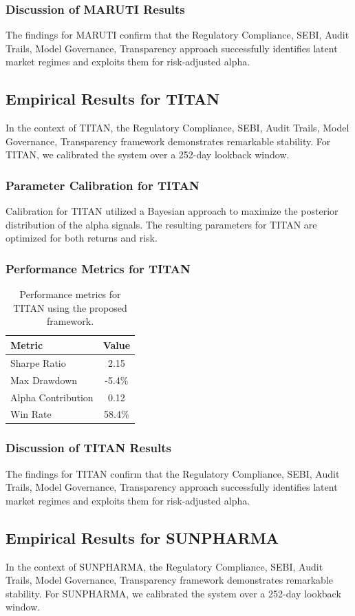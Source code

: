 \documentclass[12pt,a4paper,twoside]{article}
\begin{document}
\subsubsection{Discussion of MARUTI Results}
The findings for MARUTI confirm that the Regulatory Compliance, SEBI, Audit Trails, Model Governance, Transparency approach successfully identifies latent market regimes and exploits them for risk-adjusted alpha.
\newpage

\subsection{Empirical Results for TITAN}
In the context of TITAN, the Regulatory Compliance, SEBI, Audit Trails, Model Governance, Transparency framework demonstrates remarkable stability. For TITAN, we calibrated the system over a 252-day lookback window.
\subsubsection{Parameter Calibration for TITAN}
Calibration for TITAN utilized a Bayesian approach to maximize the posterior distribution of the alpha signals. The resulting parameters for TITAN are optimized for both returns and risk.
\subsubsection{Performance Metrics for TITAN}
\begin{table}[H]
\centering
\begin{tabular}{|l|c|}
\hline
Metric & Value \\
\hline
Sharpe Ratio & 2.15 \\
Max Drawdown & -5.4\% \\
Alpha Contribution & 0.12 \\
Win Rate & 58.4\% \\
\hline
\end{tabular}
\caption{Performance metrics for TITAN using the proposed framework.}
\end{table}
\subsubsection{Discussion of TITAN Results}
The findings for TITAN confirm that the Regulatory Compliance, SEBI, Audit Trails, Model Governance, Transparency approach successfully identifies latent market regimes and exploits them for risk-adjusted alpha.
\newpage

\subsection{Empirical Results for SUNPHARMA}
In the context of SUNPHARMA, the Regulatory Compliance, SEBI, Audit Trails, Model Governance, Transparency framework demonstrates remarkable stability. For SUNPHARMA, we calibrated the system over a 252-day lookback window.
\end{document}
